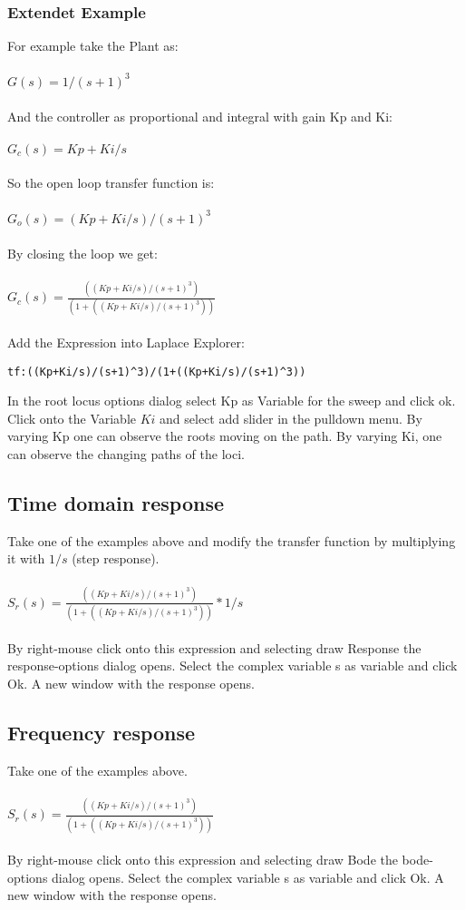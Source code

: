 \documentclass[a4paper,12pt]{article}
\begin{document}
\subsubsection{Extendet Example}
For example take the Plant as:\\\\
$G(s)=1/(s+1)^3$\\\\
And the controller as proportional and integral with gain Kp and Ki:\\\\
$G_c(s)=Kp+Ki/s$\\\\
So the open loop transfer function is:\\\\
$G_o(s)=(Kp+Ki/s)/(s+1)^3$\\\\
By closing the loop we get:\\\\
$G_c(s)=\frac{((Kp+Ki/s)/(s+1)^3)}{(1+((Kp+Ki/s)/(s+1)^3))}$\\\\
Add the Expression into Laplace Explorer:
\begin{lstlisting}
tf:((Kp+Ki/s)/(s+1)^3)/(1+((Kp+Ki/s)/(s+1)^3))
\end{lstlisting}
In the root locus options dialog select Kp as Variable for the sweep and click ok.
Click onto the Variable $Ki$ and select add slider in the pulldown menu.
By varying Kp one can observe the roots moving on the path. By varying Ki, one can observe
the changing paths of the loci.

\subsection{Time domain response}
Take one of the examples above and modify the transfer function by multiplying it with $1/s$ (step response).\\\\
$S_r(s)=\frac{((Kp+Ki/s)/(s+1)^3)}{(1+((Kp+Ki/s)/(s+1)^3))}*1/s$\\\\
By right-mouse click onto this expression and selecting draw Response the response-options dialog opens.
Select the complex variable s as variable and click Ok. A new window with the response opens.

\subsection{Frequency response}
Take one of the examples above.\\\\
$S_r(s)=\frac{((Kp+Ki/s)/(s+1)^3)}{(1+((Kp+Ki/s)/(s+1)^3))}$\\\\
By right-mouse click onto this expression and selecting draw Bode the bode-options dialog opens.
Select the complex variable s as variable and click Ok. A new window with the response opens.
\end{document}
